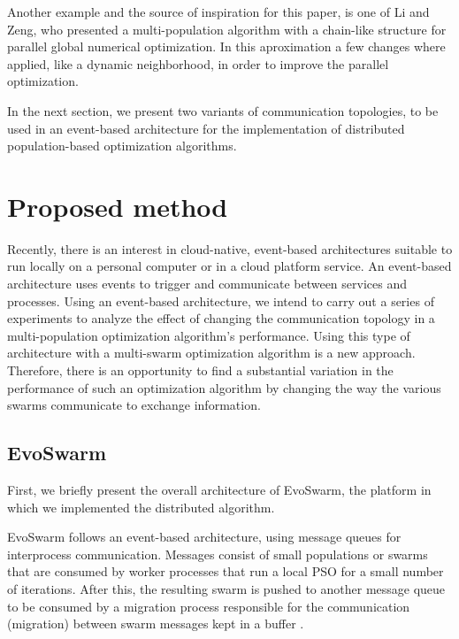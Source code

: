 \documentclass[runningheads]{llncs}
\begin{document}
Another example and the source of inspiration for this paper, is one
of Li and Zeng, who presented a multi-population algorithm with a chain-like structure for parallel global
numerical optimization. In this aproximation a few changes where applied, like a dynamic neighborhood,
in order to improve the parallel optimization\cite{b17}. 

In the next section, we present two variants of communication topologies,
to be used in an event-based architecture for the implementation of 
distributed population-based optimization algorithms.


\section{Proposed method}

Recently, there is an interest in cloud-native, event-based architectures
suitable to run locally on a personal computer or in a cloud platform service.
An event-based architecture uses events to trigger and communicate between
services and processes. Using an event-based architecture, we intend to carry
out a series of experiments to analyze the effect of changing the communication
topology in a multi-population optimization algorithm's performance. Using this
type of architecture with a multi-swarm optimization algorithm is a new
approach. Therefore, there is an opportunity to find a substantial variation in
the performance of such an optimization algorithm by changing the way the
various swarms communicate to exchange information.

\subsection{EvoSwarm} 
First, we briefly present the overall architecture of EvoSwarm, the 
platform in which we implemented the distributed algorithm. 

EvoSwarm follows an event-based architecture, using message queues for
interprocess communication. Messages consist of small populations or swarms that
are consumed by worker processes that run a local PSO for a small number of
iterations. After this, the resulting swarm is pushed to another message queue
to be consumed by a migration process responsible for the communication
(migration) between swarm messages kept in a buffer \cite{b18}.

\end{document}

